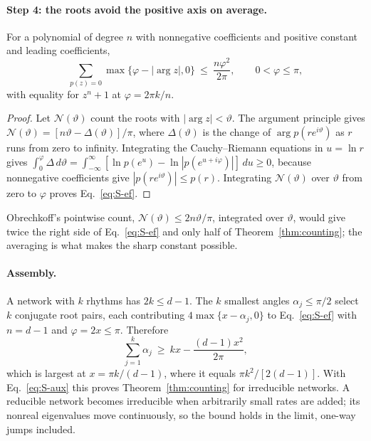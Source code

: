 \paragraph*{Step 4: the roots avoid the positive axis on average.}

\begin{lemma}\label{lem:ef}
For a polynomial of degree $n$ with nonnegative coefficients and positive constant and leading coefficients,
\begin{equation}
\sum_{p(z)=0}\max\{\varphi-|\arg z|,0\}\ \le\ \frac{n\varphi^2}{2\pi},\qquad 0<\varphi\le\pi,
\label{eq:S-ef}
\end{equation}
with equality for $z^n+1$ at $\varphi=2\pi k/n$.
\end{lemma}

\begin{proof}
Let $\mathcal N(\vartheta)$ count the roots with $|\arg z|<\vartheta$. The argument principle gives $\mathcal N(\vartheta)=[n\vartheta-\Delta(\vartheta)]/\pi$, where $\Delta(\vartheta)$ is the change of $\arg p(re^{i\vartheta})$ as $r$ runs from zero to infinity. Integrating the Cauchy--Riemann equations in $u=\ln r$ gives $\int_0^{\varphi}\Delta\,d\vartheta=\int_{-\infty}^{\infty}[\ln p(e^u)-\ln|p(e^{u+i\varphi})|]\,du\ge0$, because nonnegative coefficients give $|p(re^{i\vartheta})|\le p(r)$. Integrating $\mathcal N(\vartheta)$ over $\vartheta$ from zero to $\varphi$ proves Eq.~\eqref{eq:S-ef}.
\end{proof}

\noindent Obrechkoff's pointwise count, $\mathcal N(\vartheta)\le2n\vartheta/\pi$, integrated over $\vartheta$, would give twice the right side of Eq.~\eqref{eq:S-ef} and only half of Theorem~\ref{thm:counting}; the averaging is what makes the sharp constant possible.

\paragraph*{Assembly.} A network with $k$ rhythms has $2k\le d-1$. The $k$ smallest angles $\alpha_j\le\pi/2$ select $k$ conjugate root pairs, each contributing $4\max\{x-\alpha_j,0\}$ to Eq.~\eqref{eq:S-ef} with $n=d-1$ and $\varphi=2x\le\pi$. Therefore
\begin{equation}
\sum_{j=1}^{k}\alpha_j\ \ge\ kx-\frac{(d-1)x^2}{2\pi},
\label{eq:S-assembly}
\end{equation}
which is largest at $x=\pi k/(d-1)$, where it equals $\pi k^2/[2(d-1)]$. With Eq.~\eqref{eq:S-aux} this proves Theorem~\ref{thm:counting} for irreducible networks. A reducible network becomes irreducible when arbitrarily small rates are added; its nonreal eigenvalues move continuously, so the bound holds in the limit, one-way jumps included.

